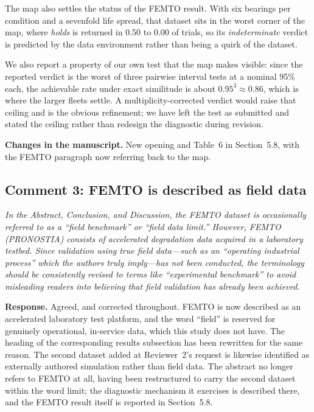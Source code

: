 \documentclass[11pt,a4paper]{article}
\newenvironment{comment}
  {\begin{list}{}{\leftmargin=6mm \rightmargin=2mm}\item[]\color{quoteline}\itshape}
  {\end{list}}
\newcommand{\where}[1]{\textbf{Changes in the manuscript.} #1}
\begin{document}
The map also settles the status of the FEMTO result. With six bearings per condition and a
sevenfold life spread, that dataset sits in the worst corner of the map, where \emph{holds} is
returned in 0.50 to 0.00 of trials, so its \emph{indeterminate} verdict is predicted by the data
environment rather than being a quirk of the dataset.

We also report a property of our own test that the map makes visible: since the reported verdict is
the worst of three pairwise interval tests at a nominal 95\% each, the achievable rate under exact
similitude is about $0.95^3\approx0.86$, which is where the larger fleets settle. A
multiplicity-corrected verdict would raise that ceiling and is the obvious refinement; we have left
the test as submitted and stated the ceiling rather than redesign the diagnostic during revision.

\where{New opening and Table~6 in Section~5.8, with the FEMTO paragraph now referring back to the
map.}

\subsection*{Comment 3: FEMTO is described as field data}
\begin{comment}
In the Abstract, Conclusion, and Discussion, the FEMTO dataset is occasionally referred to as a
``field benchmark'' or ``field data limit.'' However, FEMTO (PRONOSTIA) consists of accelerated
degradation data acquired in a laboratory testbed. Since validation using true field data---such as
an ``operating industrial process'' which the authors truly imply---has not been conducted, the
terminology should be consistently revised to terms like ``experimental benchmark'' to avoid
misleading readers into believing that field validation has already been achieved.
\end{comment}

\noindent\textbf{Response.} Agreed, and corrected throughout. FEMTO is now described as an
accelerated laboratory test platform, and the word ``field'' is reserved for genuinely operational,
in-service data, which this study does not have. The heading of the corresponding results
subsection has been rewritten for the same reason. The second dataset added at Reviewer~2's request
is likewise identified as externally authored simulation rather than field data. The abstract no
longer refers to FEMTO at all, having been restructured to carry the second dataset within the
word limit; the diagnostic mechanism it exercises is described there, and the FEMTO result itself
is reported in Section~5.8.
\end{document}
